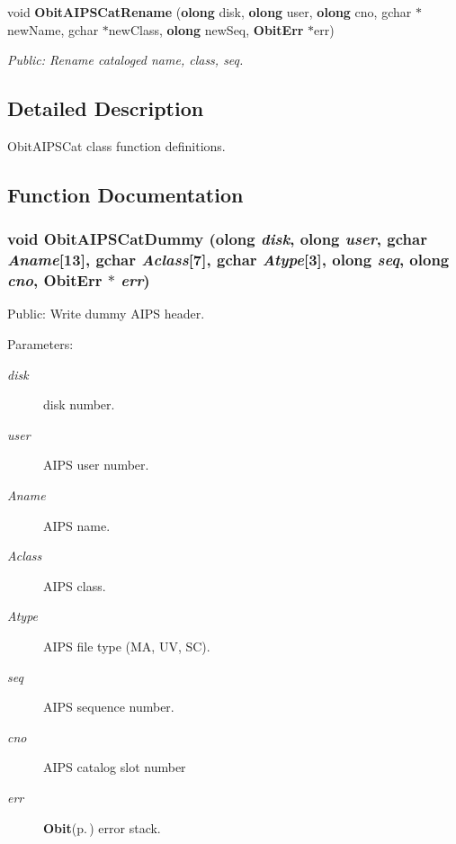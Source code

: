 \begin{CompactItemize}
void {\bf Obit\-AIPSCat\-Rename} ({\bf olong} disk, {\bf olong} user, {\bf olong} cno, gchar $\ast$new\-Name, gchar $\ast$new\-Class, {\bf olong} new\-Seq, {\bf Obit\-Err} $\ast$err)
\begin{CompactList}\small\item\em Public: Rename cataloged name, class, seq. \item\end{CompactList}\end{CompactItemize}


\subsection{Detailed Description}
Obit\-AIPSCat class function definitions. 



\subsection{Function Documentation}
\subsubsection{\setlength{\rightskip}{0pt plus 5cm}void Obit\-AIPSCat\-Dummy ({\bf olong} {\em disk}, {\bf olong} {\em user}, gchar {\em Aname}[13], gchar {\em Aclass}[7], gchar {\em Atype}[3], {\bf olong} {\em seq}, {\bf olong} {\em cno}, {\bf Obit\-Err} $\ast$ {\em err})}\label{ObitAIPSCat_8c_a15}


Public: Write dummy AIPS header. 

\begin{Desc}
\item[Parameters:]
\begin{description}
\item[{\em disk}]disk number. \item[{\em user}]AIPS user number. \item[{\em Aname}]AIPS name. \item[{\em Aclass}]AIPS class. \item[{\em Atype}]AIPS file type (MA, UV, SC). \item[{\em seq}]AIPS sequence number. \item[{\em cno}]AIPS catalog slot number \item[{\em err}]{\bf Obit}{\rm (p.\,\pageref{structObit})} error stack. \end{description}
\end{Desc}
